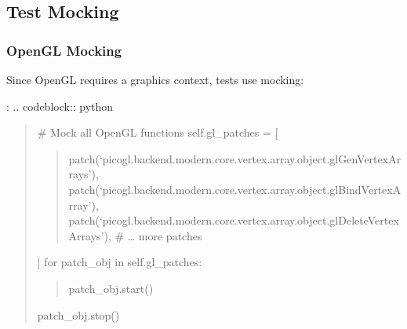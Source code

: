 \documentclass[a4paper,10pt,english,openany,oneside]{sphinxmanual}
\begin{document}
\subsection{Test Mocking}
\label{\detokenize{testing:test-mocking}}

\subsubsection{OpenGL Mocking}
\label{\detokenize{testing:opengl-mocking}}
\sphinxAtStartPar
Since OpenGL requires a graphics context, tests use mocking:

\sphinxAtStartPar
{}:
.. code\sphinxhyphen{}block:: python
\begin{quote}
\begin{description}
\begin{description}
\sphinxAtStartPar
\# Mock all OpenGL functions
self.gl\_patches = {[}
\begin{quote}

\sphinxAtStartPar
patch(‘picogl.backend.modern.core.vertex.array.object.glGenVertexArrays’),
patch(‘picogl.backend.modern.core.vertex.array.object.glBindVertexArray’),
patch(‘picogl.backend.modern.core.vertex.array.object.glDeleteVertexArrays’),
\# … more patches
\end{quote}

\sphinxAtStartPar
{]}
for patch\_obj in self.gl\_patches:
\begin{quote}

\sphinxAtStartPar
patch\_obj.start()
\end{quote}

\begin{description}
\sphinxAtStartPar
patch\_obj.stop()

\end{description}

\end{description}

\end{description}
\end{quote}
\end{document}
